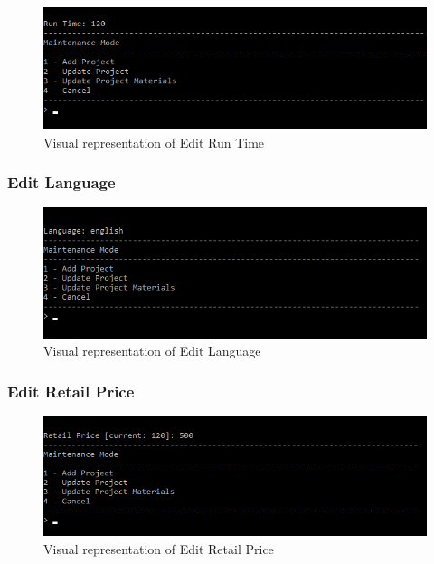 \documentclass[
  english,
  a4paper,
,tablecaptionabove
]{scrartcl}
\begin{document}
\begin{figure}
\centering
\includegraphics{images/ui-screenshots/update-project-material-run-time.png}
\caption{Visual representation of Edit Run Time}
\end{figure}

\newpage

\hypertarget{edit-language}{%
\subsubsection{Edit Language}\label{edit-language}}

\begin{figure}
\centering
\includegraphics{images/ui-screenshots/update-project-material-language.png}
\caption{Visual representation of Edit Language}
\end{figure}

\newpage

\hypertarget{edit-retail-price}{%
\subsubsection{Edit Retail Price}\label{edit-retail-price}}

\begin{figure}
\centering
\includegraphics{images/ui-screenshots/update-project-material-retail-price.png}
\caption{Visual representation of Edit Retail Price}
\end{figure}
\end{document}
